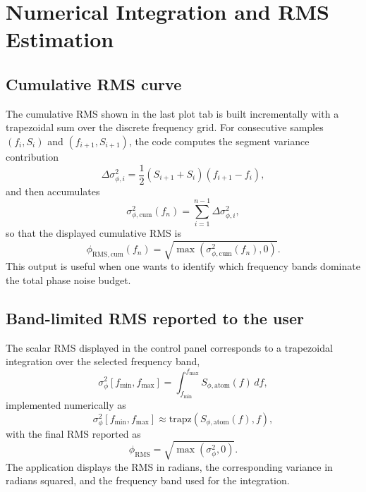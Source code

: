 \documentclass[11pt,a4paper]{report}
\begin{document}
\chapter{Numerical Integration and RMS Estimation}

\section{Cumulative RMS curve}

The cumulative RMS shown in the last plot tab is built incrementally with a trapezoidal sum over the discrete frequency grid. For consecutive samples $(f_i, S_i)$ and $(f_{i+1}, S_{i+1})$, the code computes the segment variance contribution
\begin{equation}
\Delta \sigma_{\phi,i}^2 = \frac{1}{2}\left(S_{i+1}+S_i\right)\left(f_{i+1}-f_i\right),
\end{equation}
and then accumulates
\begin{equation}
\sigma_{\phi,\mathrm{cum}}^2(f_n) = \sum_{i=1}^{n-1} \Delta \sigma_{\phi,i}^2,
\end{equation}
so that the displayed cumulative RMS is
\begin{equation}
\phi_{\mathrm{RMS,cum}}(f_n) = \sqrt{\max\left(\sigma_{\phi,\mathrm{cum}}^2(f_n), 0\right)}.
\end{equation}
This output is useful when one wants to identify which frequency bands dominate the total phase noise budget.

\section{Band-limited RMS reported to the user}

The scalar RMS displayed in the control panel corresponds to a trapezoidal integration over the selected frequency band,
\begin{equation}
\sigma_\phi^2[f_{\min}, f_{\max}] = \int_{f_{\min}}^{f_{\max}} S_{\phi,\mathrm{atom}}(f)\,df,
\end{equation}
implemented numerically as
\begin{equation}
\sigma_\phi^2[f_{\min}, f_{\max}] \approx \mathrm{trapz}\left(S_{\phi,\mathrm{atom}}(f), f\right),
\end{equation}
with the final RMS reported as
\begin{equation}
\phi_{\mathrm{RMS}} = \sqrt{\max\left(\sigma_\phi^2, 0\right)}.
\label{eq:rms}
\end{equation}
The application displays the RMS in radians, the corresponding variance in radians squared, and the frequency band used for the integration.
\end{document}

